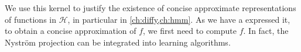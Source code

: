 We use this kernel to justify the existence of concise approximate representations of functions in $\mathcal H$, in particular in \cref{ch:diffy,ch:hmm}. As we have a expressed it, to obtain a concise approximation of $f$, we first need to compute $f$. In fact, the Nyström projection can be integrated into learning algorithms.







